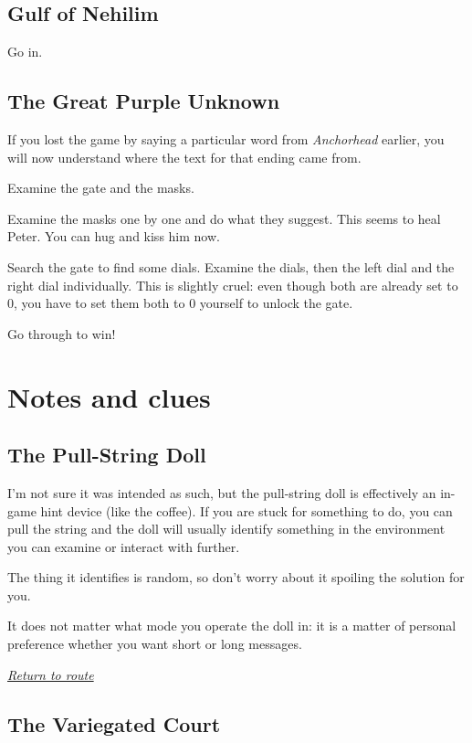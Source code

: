 \documentclass[a5paper]{extarticle}
\begin{document}
\newpage
\subsection{Gulf of Nehilim}\label{sec:sol-Gulf-of-Nehilim}

Go in.

\vfill
\subsection{The Great Purple Unknown}

If you lost the game by saying a particular word from \emph{Anchorhead} earlier,
you will now understand where the text for that ending came from.

Examine the gate and the masks.

Examine the masks one by one and do what they suggest.
This seems to heal Peter. You can hug and kiss him now.

Search the gate to find some dials.
Examine the dials, then the left dial and the right dial individually.
This is slightly cruel: even though both are already set to 0,
you have to set them both to 0 yourself to unlock the gate.

Go through to win!

\newpage
\section{Notes and clues}\label{sec:nb}

\subsection{The Pull-String Doll}\label{sec:nb-doll}

I'm not sure it was intended as such,
but the pull-string doll is effectively an in-game hint device (like the coffee).
If you are stuck for something to do,
you can pull the string and the doll will usually identify something in the
environment you can examine or interact with further.

The thing it identifies is random,
so don't worry about it spoiling the solution for you.

It does not matter what mode you operate the doll in:
it is a matter of personal preference whether you want short or long messages.

\hyperref[sec:route]{\emph{Return to route}}

\newpage
\subsection{The Variegated Court}\label{sec:nb-Variegated-Court}
\end{document}
